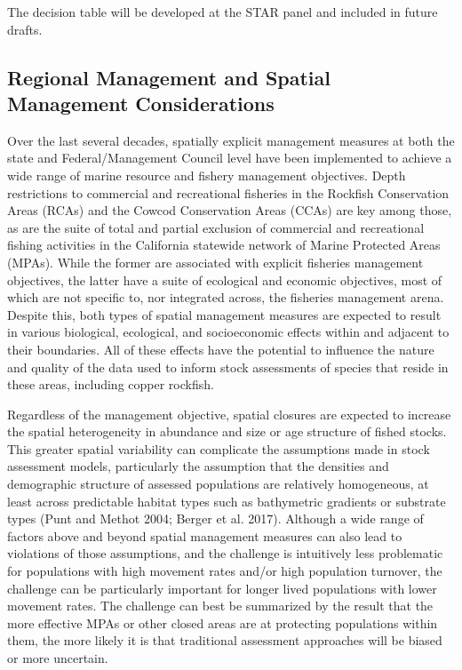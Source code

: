 \documentclass[11pt,
  english,
  letterpaper,
]{article}
\begin{document}
The decision table will be developed at the STAR panel and included in future drafts.

\hypertarget{regional-management-and-spatial-management-considerations}{%
\subsection{Regional Management and Spatial Management Considerations}\label{regional-management-and-spatial-management-considerations}}

Over the last several decades, spatially explicit management measures at both the state and Federal/Management Council level have been implemented to achieve a wide range of marine resource and fishery management objectives. Depth restrictions to commercial and recreational fisheries in the Rockfish Conservation Areas (RCAs) and the Cowcod Conservation Areas (CCAs) are key among those, as are the suite of total and partial exclusion of commercial and recreational fishing activities in the California statewide network of Marine Protected Areas (MPAs). While the former are associated with explicit fisheries management objectives, the latter have a suite of ecological and economic objectives, most of which are not specific to, nor integrated across, the fisheries management arena. Despite this, both types of spatial management measures are expected to result in various biological, ecological, and socioeconomic effects within and adjacent to their boundaries. All of these effects have the potential to influence the nature and quality of the data used to inform stock assessments of species that reside in these areas, including copper rockfish.

Regardless of the management objective, spatial closures are expected to increase the spatial heterogeneity in abundance and size or age structure of fished stocks. This greater spatial variability can complicate the assumptions made in stock assessment models, particularly the assumption that the densities and demographic structure of assessed populations are relatively homogeneous, at least across predictable habitat types such as bathymetric gradients or substrate types (Punt and Methot 2004; Berger et al. 2017). Although a wide range of factors above and beyond spatial management measures can also lead to violations of those assumptions, and the challenge is intuitively less problematic for populations with high movement rates and/or high population turnover, the challenge can be particularly important for longer lived populations with lower movement rates. The challenge can best be summarized by the result that the more effective MPAs or other closed areas are at protecting populations within them, the more likely it is that traditional assessment approaches will be biased or more uncertain.
\end{document}
